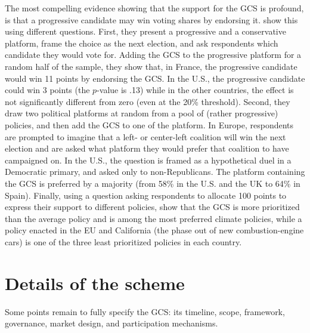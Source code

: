 \documentclass[12pt,english]{article}
\begin{document}
The most compelling evidence showing that the support for the GCS is profound, is that a progressive candidate may win voting shares by endorsing it. \citet{fabre_international_2023} show this using different questions. First, they present a progressive and a conservative platform, frame the choice as the next election, and ask respondents which candidate they would vote for. Adding the GCS to the progressive platform for a random half of the sample, they show that, in France, the progressive candidate would win 11 points by endorsing the GCS. In the U.S., the progressive candidate could win 3 points (the $p$-value is .13) while in the other countries, the effect is not significantly different from zero (even at the 20\% threshold). Second, they draw two political platforms at random from a pool of (rather progressive) policies, and then add the GCS to one of the platform. In Europe, respondents are prompted to imagine that a left- or center-left coalition will win the next election and are asked what platform they would prefer that coalition to have campaigned on. In the U.S., the question is framed as a hypothetical duel in a Democratic primary, and asked only to non-Republicans. The platform containing the GCS is preferred by a majority (from 58\% in the U.S. and the UK to 64\% in Spain). Finally, using a question asking respondents to allocate 100 points to express their support to different policies, \citet{fabre_international_2023} show that the GCS is more prioritized than the average policy and is among the most preferred climate policies, while a policy enacted in the EU and California (the phase out of new combustion-engine cars) is one of the three least prioritized policies in each country. 


\section{Details of the scheme}\label{sec:details}

Some points remain to fully specify the GCS: its timeline, scope, framework, governance, market design, and participation mechanisms. 
\end{document}
